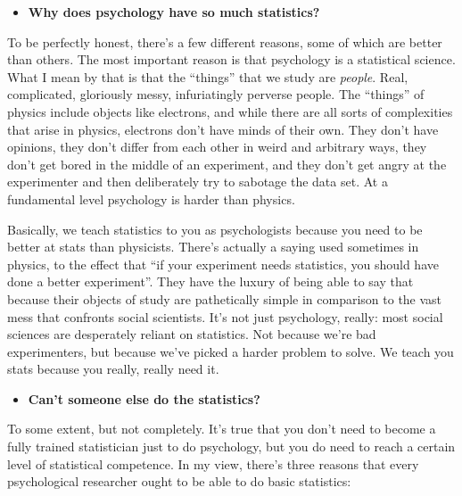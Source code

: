 \documentclass[]{book}
\providecommand{\tightlist}{%
  \setlength{\itemsep}{0pt}\setlength{\parskip}{0pt}}
\begin{document}
\begin{itemize}
\tightlist
\item
  \textbf{Why does psychology have so much statistics?}
\end{itemize}

To be perfectly honest, there's a few different reasons, some of which are better than others. The most important reason is that psychology is a statistical science. What I mean by that is that the ``things'' that we study are \emph{people}. Real, complicated, gloriously messy, infuriatingly perverse people. The ``things'' of physics include objects like electrons, and while there are all sorts of complexities that arise in physics, electrons don't have minds of their own. They don't have opinions, they don't differ from each other in weird and arbitrary ways, they don't get bored in the middle of an experiment, and they don't get angry at the experimenter and then deliberately try to sabotage the data set. At a fundamental level psychology is harder than physics.

Basically, we teach statistics to you as psychologists because you need to be better at stats than physicists. There's actually a saying used sometimes in physics, to the effect that ``if your experiment needs statistics, you should have done a better experiment''. They have the luxury of being able to say that because their objects of study are pathetically simple in comparison to the vast mess that confronts social scientists. It's not just psychology, really: most social sciences are desperately reliant on statistics. Not because we're bad experimenters, but because we've picked a harder problem to solve. We teach you stats because you really, really need it.

\begin{itemize}
\tightlist
\item
  \textbf{Can't someone else do the statistics?}
\end{itemize}

To some extent, but not completely. It's true that you don't need to become a fully trained statistician just to do psychology, but you do need to reach a certain level of statistical competence. In my view, there's three reasons that every psychological researcher ought to be able to do basic statistics:
\end{document}
